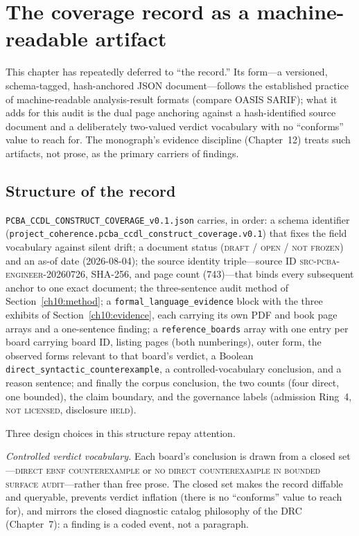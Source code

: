 \section{The coverage record as a machine-readable artifact}\label{ch10:artifact}

This chapter has repeatedly deferred to ``the record.'' Its form---a versioned, schema-tagged, hash-anchored JSON document---follows the established practice of machine-readable analysis-result formats (compare OASIS SARIF); what it adds for this audit is the dual page anchoring against a hash-identified source document and a deliberately two-valued verdict vocabulary with no ``conforms'' value to reach for. The monograph's evidence discipline (Chapter~12) treats such artifacts, not prose, as the primary carriers of findings.

\subsection{Structure of the record}

\texttt{PCBA\_CCDL\_CONSTRUCT\_COVERAGE\_v0.1.json} carries, in order: a schema identifier (\texttt{project\_coherence.pcba\_ccdl\_construct\_coverage.v0.1}) that fixes the field vocabulary against silent drift; a document status (\textsc{draft / open / not frozen}) and an as-of date (2026-08-04); the source identity triple---source ID \textsc{src-pcba-engineer-20260726}, SHA-256, and page count (743)---that binds every subsequent anchor to one exact document; the three-sentence audit method of Section~\ref{ch10:method}; a \texttt{formal\_language\_evidence} block with the three exhibits of Section~\ref{ch10:evidence}, each carrying its own PDF and book page arrays and a one-sentence finding; a \texttt{reference\_boards} array with one entry per board carrying board ID, listing pages (both numberings), outer form, the observed forms relevant to that board's verdict, a Boolean \texttt{direct\_syntactic\_counterexample}, a controlled-vocabulary conclusion, and a reason sentence; and finally the corpus conclusion, the two counts (four direct, one bounded), the claim boundary, and the governance labels (admission Ring~4, \textsc{not licensed}, disclosure \textsc{held}).

Three design choices in this structure repay attention.

\emph{Controlled verdict vocabulary.} Each board's conclusion is drawn from a closed set---\textsc{direct ebnf counterexample} or \textsc{no direct counterexample in bounded surface audit}---rather than free prose. The closed set makes the record diffable and queryable, prevents verdict inflation (there is no ``conforms'' value to reach for), and mirrors the closed diagnostic catalog philosophy of the DRC (Chapter~7): a finding is a coded event, not a paragraph.

